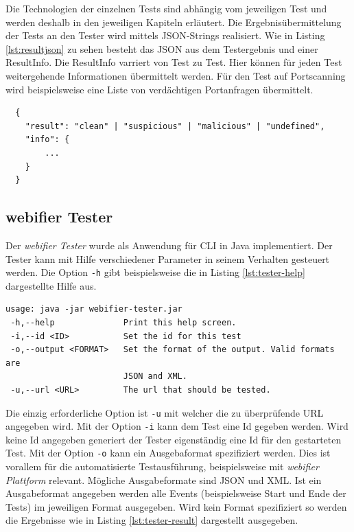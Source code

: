 Die Technologien der einzelnen Tests sind abhängig vom jeweiligen Test und werden deshalb in den
jeweiligen Kapiteln erläutert. Die Ergebnisübermittelung der Tests an den Tester wird mittels
\ac{JSON}-Strings realisiert. Wie in Listing \ref{lst:resultjson} zu sehen besteht das \ac{JSON} aus dem
Testergebnis und einer ResultInfo. Die ResultInfo varriert von Test zu Test. Hier können für jeden
Test weitergehende Informationen übermittelt werden. Für den Test auf Portscanning wird
beispielsweise eine Liste von verdächtigen Portanfragen übermittelt.

\begin{scriptsize}
\begin{lstlisting}
  {
  	"result": "clean" | "suspicious" | "malicious" | "undefined",
  	"info": {
  		...
  	}
  }
\end{lstlisting}
\end{scriptsize}


\subsection{webifier Tester}

Der \textit{webifier Tester} wurde als Anwendung für \ac{CLI} in Java implementiert. Der Tester
kann mit Hilfe verschiedener Parameter in seinem Verhalten gesteuert werden. Die Option
\lstinline[style=eclipse]{-h} gibt beispielsweise die in Listing \ref{lst:tester-help} dargestellte
Hilfe aus.

\begin{scriptsize}
\begin{lstlisting}
usage: java -jar webifier-tester.jar
 -h,--help              Print this help screen.
 -i,--id <ID>           Set the id for this test
 -o,--output <FORMAT>   Set the format of the output. Valid formats are
                        JSON and XML.
 -u,--url <URL>         The url that should be tested.
\end{lstlisting}
\end{scriptsize}

Die einzig erforderliche Option ist \lstinline[style=eclipse]{-u} mit welcher die zu überprüfende
\acs{URL} angegeben wird. Mit der Option \lstinline[style=eclipse]{-i} kann dem Test eine Id gegeben
werden. Wird keine Id angegeben generiert der Tester eigenständig eine Id für den gestarteten Test.
Mit der Option \lstinline[style=eclipse]{-o} kann ein Ausgebaformat spezifiziert werden. Dies ist
vorallem für die automatisierte Testausführung, beispielsweise mit \textit{webifier Plattform}
relevant. Mögliche Ausgabeformate sind \ac{JSON} und \ac{XML}. Ist ein Ausgabeformat angegeben
werden alle Events (beispielsweise Start und Ende der Tests) im jeweiligen Format ausgegeben. Wird
kein Format spezifiziert so werden die Ergebnisse wie in Listing \ref{lst:tester-result}
dargestellt ausgegeben.

